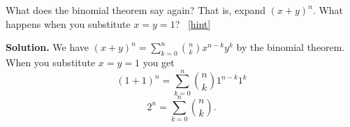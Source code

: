 \documentclass{book}
\begin{document}
\setcounter{project}{79}
\addtocounter{project}{-1}
\begin{activity}[]\label{act-pascalrowsum-binom}
\hypertarget{p-626}{}%
What does the binomial theorem say again?  That is, expand \((x+y)^n\).  What happens when you substitute \(x = y = 1\)?%
~\hfill{\tiny\hyperlink{a-79}{[hint]}\hypertarget{q-79}{}}\par\smallskip%
\noindent\textbf{Solution.}\hypertarget{solution-62}{}\quad%
\hypertarget{p-628}{}%
We have \((x+y)^n = \sum_{k=0}^n \binom{n}{k} x^{n-k}y^k\) by the binomial theorem.  When you substitute \(x = y = 1\) you get%
\begin{equation*}
(1+1)^n = \sum_{k=0}^n \binom{n}{k} 1^{n-k}1^k
\end{equation*}
%
\begin{equation*}
2^n = \sum_{k=0}^n \binom{n}{k}.
\end{equation*}
%
\end{activity}
\end{document}
